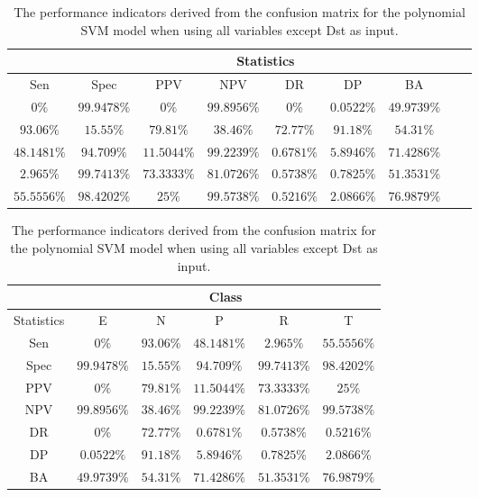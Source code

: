 \begin{table}[!ht]
	\centering
	\begin{tabular}{|c|c|c|c|c|c|c|c|c|}
		\hline
		 & \multicolumn{7}{c|}{Statistics} \\ \hline
		Sen & Spec & PPV & NPV & DR & DP & BA \\ \hline
		$0\%$ & $99.9478\%$ & $0\%$ & $99.8956\%$ & $0\%$ & $0.0522\%$ & $49.9739\%$ \\ \hline
		$93.06\%$ & $15.55\%$ & $79.81\%$ & $38.46\%$ & $72.77\%$ & $91.18\%$ & $54.31\%$ \\ \hline
		$48.1481\%$ & $94.709\%$ & $11.5044\%$ & $99.2239\%$ & $0.6781\%$ & $5.8946\%$ & $71.4286\%$ \\ \hline
		$2.965\%$ & $99.7413\%$ & $73.3333\%$ & $81.0726\%$ & $0.5738\%$ & $0.7825\%$ & $51.3531\%$ \\ \hline
		$55.5556\%$ & $98.4202\%$ & $25\%$ & $99.5738\%$ & $0.5216\%$ & $2.0866\%$ & $76.9879\%$ \\ \hline
	\end{tabular}
	\caption{The performance indicators derived from the confusion matrix for the polynomial SVM model when using all variables except Dst as input.}
	\label{tab:cs:noDst:svmPoly}
\end{table}

\begin{table}[!ht]
	\centering
	\begin{tabular}{|c|c|c|c|c|c|}
		\hline
		 & \multicolumn{5}{c|}{Class} \\ \hline
		Statistics & E & N & P & R & T \\ \hline
		Sen & $0\%$ & $93.06\%$ & $48.1481\%$ & $2.965\%$ & $55.5556\%$ \\ \hline
		Spec & $99.9478\%$ & $15.55\%$ & $94.709\%$ & $99.7413\%$ & $98.4202\%$ \\ \hline
		PPV & $0\%$ & $79.81\%$ & $11.5044\%$ & $73.3333\%$ & $25\%$ \\ \hline
		NPV & $99.8956\%$ & $38.46\%$ & $99.2239\%$ & $81.0726\%$ & $99.5738\%$ \\ \hline
		DR & $0\%$ & $72.77\%$ & $0.6781\%$ & $0.5738\%$ & $0.5216\%$ \\ \hline
		DP & $0.0522\%$ & $91.18\%$ & $5.8946\%$ & $0.7825\%$ & $2.0866\%$ \\ \hline
		BA & $49.9739\%$ & $54.31\%$ & $71.4286\%$ & $51.3531\%$ & $76.9879\%$ \\ \hline
	\end{tabular}
	\caption{The performance indicators derived from the confusion matrix for the polynomial SVM model when using all variables except Dst as input.}
	\label{tab:cs:reverse:noDst:svmPoly}
\end{table}

